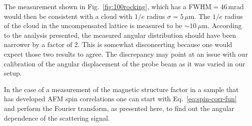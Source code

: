 The measurement shown in Fig.~\ref{fig:100rocking}, which has a FWHM$=46\,$mrad
would then be consistent with a cloud with $1/e$ radius  $\sigma = 5\,\mu$m.
The $1/e$ radius of the cloud in the uncompensated lattice is measured to be
$\sim10~\mu$m.   According to the analysis presented, the measured angular
distribution should have been narrower by a factor of 2.   This is somewhat
disconcerting because one would expect those two results to agree.   The
discrepancy may point at an issue with our calibration of the angular
displacement of the probe beam as it was varied in our setup.


In the case of a measurement of the magnetic structure factor in a sample that
has developed AFM spin correlations one can start with
Eq.~\ref{eq:spin-corr-fun} and perform the Fourier transform, as presented
here, to find out the angular dependence of the scattering signal. 


